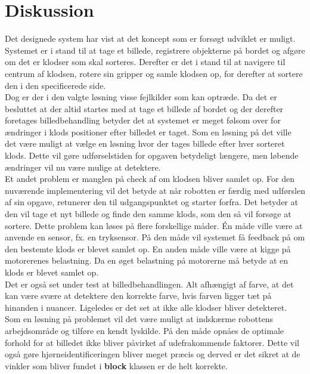 \clearpage
\section{Diskussion}
Det designede system har vist at det koncept som er forsøgt udviklet er muligt. Systemet er i stand til at tage et billede, registrere objekterne på bordet og afgøre om det er klodser som skal sorteres. Derefter er det i stand til at navigere til centrum af klodsen, rotere sin gripper og samle klodsen op, for derefter at sortere den i den specificerede side.\\

Dog er der i den valgte løsning visse fejlkilder som kan optræde. Da det er besluttet at der altid startes med at tage et billede af bordet og der derefter foretages billedbehandling betyder det at systemet er meget følsom over for ændringer i klods positioner efter billedet er taget. Som en løsning på det ville det være muligt at vælge en løsning hvor der tages billede efter hver sorteret klods. Dette vil gøre udførselstiden for opgaven betydeligt længere, men løbende ændringer vil nu være mulige at detektere.\\ 

Et andet problem er manglen på check af om klodsen bliver samlet op. For den nuværende implementering vil det betyde at når robotten er færdig med udførslen af sin opgave, retunerer den til udgangspunktet og starter forfra. Det betyder at den vil tage et nyt billede og finde den samme klods, som den så vil forsøge at sortere. Dette problem kan løses på flere forskellige måder. Én måde ville være at anvende en sensor, fx. en tryksensor. På den måde vil systemet få feedback på om den bestemte klods er blevet samlet op. En anden måde ville være at kigge på motorerenes belastning. Da en øget belastning på motorerne må betyde at en klods er blevet samlet op.\\

Det er også set under test at billedbehandlingen. Alt afhængigt af farve, at det kan være svære at detektere den korrekte farve, hvis farven ligger tæt på hinanden i nuancer. Ligeledes er det set at ikke alle klodser bliver detekteret.  Som en løsning på problemet vil det være muligt at indskærme robottens arbejdsområde og tilføre en kendt lyskilde. På den måde opnåes de optimale forhold for at billedet ikke bliver påvirket af udefrakommende faktorer. Dette vil også gøre hjørneidentificeringen bliver meget præcis og derved er det sikret at de vinkler som bliver fundet i \textbf{block} klassen er de helt korrekte.\\


